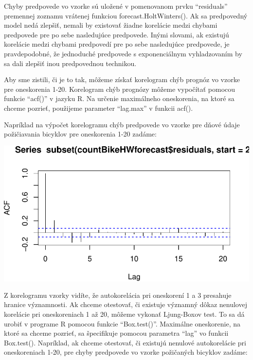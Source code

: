 \documentclass[
  letterpaper,
  DIV=11,
  numbers=noendperiod]{scrreprt}
\newenvironment{Shaded}{\begin{snugshade}}{\end{snugshade}}
\newcommand{\AttributeTok}[1]{\textcolor[rgb]{0.40,0.45,0.13}{#1}}
\newcommand{\DecValTok}[1]{\textcolor[rgb]{0.68,0.00,0.00}{#1}}
\newcommand{\FunctionTok}[1]{\textcolor[rgb]{0.28,0.35,0.67}{#1}}
\newcommand{\NormalTok}[1]{\textcolor[rgb]{0.00,0.23,0.31}{#1}}
\newcommand{\SpecialCharTok}[1]{\textcolor[rgb]{0.37,0.37,0.37}{#1}}
\begin{document}
Chyby predpovede vo vzorke sú uložené v pomenovanom prvku ``residuals''
premennej zoznamu vrátenej funkciou forecast.HoltWinters(). Ak sa
predpovedný model nedá zlepšiť, nemali by existovať žiadne korelácie
medzi chybami predpovede pre po sebe nasledujúce predpovede. Inými
slovami, ak existujú korelácie medzi chybami predpovedí pre po sebe
nasledujúce predpovede, je pravdepodobné, že jednoduché predpovede s
exponenciálnym vyhladzovaním by sa dali zlepšiť inou predpovednou
technikou.

Aby sme zistili, či je to tak, môžeme získať korelogram chýb prognóz vo
vzorke pre oneskorenia 1-20. Korelogram chýb prognózy môžeme vypočítať
pomocou funkcie ``acf()'' v jazyku R. Na určenie maximálneho
oneskorenia, na ktoré sa chceme pozrieť, použijeme parameter ``lag.max''
v funkcii acf().

Napríklad na výpočet korelogramu chýb predpovede vo vzorke pre dňové
údaje požičiavania bicyklov pre oneskorenia 1-20 zadáme:

\begin{Shaded}
\end{Shaded}

\includegraphics{prednaska2_HoltWinters_files/figure-pdf/unnamed-chunk-12-1.pdf}

Z korelogramu vzorky vidíte, že autokorelácia pri oneskorení 1 a 3
presahuje hranice významnosti. Ak chceme otestovať, či existuje významný
dôkaz nenulovej korelácie pri oneskoreniach 1 až 20, môžeme vykonať
Ljung-Boxov test. To sa dá urobiť v programe R pomocou funkcie
``Box.test()''. Maximálne oneskorenie, na ktoré sa chceme pozrieť, sa
špecifikuje pomocou parametra ``lag'' vo funkcii Box.test(). Napríklad,
ak chceme otestovať, či existujú nenulové autokorelácie pri
oneskoreniach 1-20, pre chyby predpovede vo vzorke požičaných bicyklov
zadáme:
\end{document}
